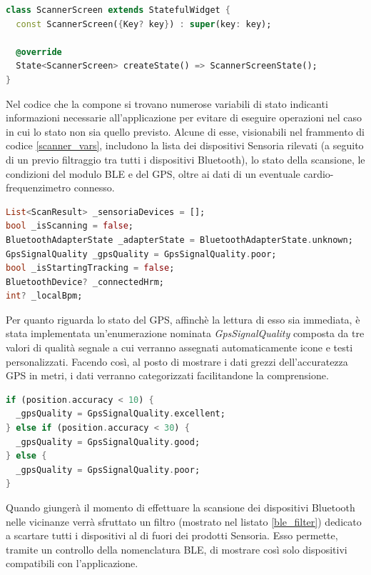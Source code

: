 \documentclass[target=bach,aauheader=,style=]{thud}
\begin{document}
\begin{lstlisting}[language=dart, caption={Definizione della schermata di scansione.}, label={scanner_def}]
class ScannerScreen extends StatefulWidget {
  const ScannerScreen({Key? key}) : super(key: key);

  @override
  State<ScannerScreen> createState() => ScannerScreenState();
}
\end{lstlisting}
Nel codice che la compone si trovano numerose variabili di stato indicanti informazioni necessarie all'applicazione per evitare di eseguire operazioni nel caso in cui lo stato non sia quello previsto. Alcune di esse, visionabili nel frammento di codice \ref{scanner_vars}, includono la lista dei dispositivi Sensoria rilevati (a seguito di un previo filtraggio tra tutti i dispositivi Bluetooth), lo stato della scansione, le condizioni del modulo BLE e del GPS, oltre ai dati di un eventuale cardio-frequenzimetro connesso.

\begin{lstlisting}[language=dart, caption={Variabili di stato della \textit{scanner screen}.}, label={scanner_vars}]
List<ScanResult> _sensoriaDevices = [];
bool _isScanning = false; 
BluetoothAdapterState _adapterState = BluetoothAdapterState.unknown;
GpsSignalQuality _gpsQuality = GpsSignalQuality.poor; 
bool _isStartingTracking = false; 
BluetoothDevice? _connectedHrm; 
int? _localBpm;
\end{lstlisting}
Per quanto riguarda lo stato del GPS, affinchè la lettura di esso sia immediata, è stata implementata un'enumerazione nominata \textit{GpsSignalQuality} composta da tre valori di qualità segnale a cui verranno assegnati automaticamente icone e testi personalizzati.
Facendo così, al posto di mostrare i dati grezzi dell'accuratezza GPS in metri, i dati verranno categorizzati facilitandone la comprensione.

\begin{lstlisting}[language=dart, caption={Classificazione della qualità GPS in base all'accuratezza.}, label={gps_accuracy}]
if (position.accuracy < 10) {
  _gpsQuality = GpsSignalQuality.excellent;
} else if (position.accuracy < 30) {
  _gpsQuality = GpsSignalQuality.good;
} else {
  _gpsQuality = GpsSignalQuality.poor;
}
\end{lstlisting}
Quando giungerà il momento di effettuare la scansione dei dispositivi Bluetooth nelle vicinanze verrà sfruttato un filtro (mostrato nel listato \ref{ble_filter}) dedicato a scartare tutti i dispositivi al di fuori dei prodotti Sensoria. Esso permette, tramite un controllo della nomenclatura BLE, di mostrare così solo dispositivi compatibili con l'applicazione.
\end{document}
